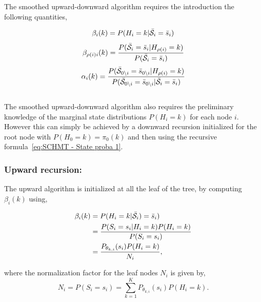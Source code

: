 \documentclass[a4paper,11pt]{report}
\begin{document}
			The smoothed upward-downward algorithm requires the introduction the following quantities,
			
			\begin{equation}
			  \beta_{i}(k) = P(H_{i}=k | \bar{\mathcal{S}}_{i}= \bar{s}_{i})
			  \label{eq:UD beta node}
			\end{equation}
			\begin{equation}
			  \beta_{\rho(i)i}(k) = \frac{P(\bar{\mathcal{S}}_{i}= \bar{s}_{i} | H_{\rho(i)}=k)} {P(\bar{\mathcal{S}}_{i}= \bar{s}_{i}) }
			  \label{eq:UD beta node and parents}
			\end{equation}
						\begin{equation}
			  \alpha_{i}(k) = \frac{P(\bar{\mathcal{S}}_{0\backslash i}= \bar{s}_{0\backslash i} | H_{\rho(i)}=k)} {P(\bar{\mathcal{S}}_{0\backslash i}= \bar{s}_{0\backslash i} | \bar{\mathcal{S}}_{i}= \bar{s}_{i} ) }
			  \label{eq:UD alpha}
			\end{equation}\\
			
			The smoothed upward-downward algorithm also requires the preliminary knowledge  of the marginal state distributions $P(H_{i}=k)$ for each node $i$. However this can simply be achieved by a downward recursion initialized for the root node with $P(H_{0}=k)=\pi_{0}(k)$ and then using the recursive formula~\ref{eq:SCHMT - State proba 1}.
			
			\subsubsection{Upward recursion:}
				\label{subsubsec:SHMT/Learning/E/Up}
				The upward algorithm is initialized at all the leaf of the tree, by computing $\beta_{i}(k)$ using,
				
				\begin{equation}
					\begin{split}
						\beta_{i}(k)	&= P(H_{i}=k | \bar{\mathcal{S}}_{i})= \bar{s}_{i})\\
													&= \frac{P(S_{i}= s_{i} | H_{i}=k)P(H_{i}=k)} {P(S_{i}= s_{i})}\\
													&= \frac{P_{\theta_{k,i}}(s_{i}) P(H_{i}=k)} {N_{i}},
						\end{split}
						\label{eq:upward beta leaf}
				\end{equation}
				
				where the normalization factor for the leaf nodes $N_{i}$ is given by,
				\begin{equation}
					N_{i}	= P(S_{i}= s_{i}) = \sum_{k=1}^{K} P_{\theta_{k,i}}(s_{i}) P(H_{i}=k).
					\label{eq:upward normalization leaf}
				\end{equation}
				
\end{document}
